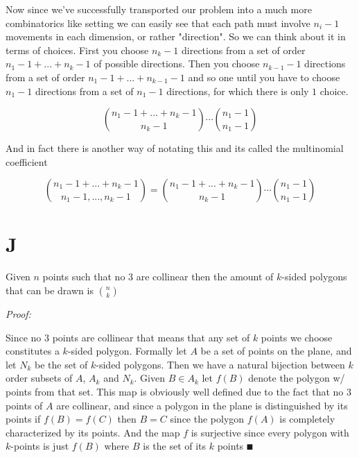 \documentclass[paper=a4,fontsize=paper,12.5pt]{book}
\newcommand{\3}{\vspace*{3mm}}
\newcommand{\Proof}{\textit{Proof:}}
\newcommand*{\comb}[2]{\binom{#1}{#2}}
\begin{document}
\3

Now since we've successfully transported our problem into a much more combinatorics like setting we can easily see that each path must involve ${n}_{i}-1$ movements in each dimension, or rather "direction". So we can think about it in terms of choices. First you choose ${n}_{k}-1$ directions from a set of order ${n}_{1} - 1 + ... + {n}_{k} - 1$ of possible directions. Then you choose ${n}_{k-1} - 1$ directions from a set of order ${n}_{1} - 1 + ... + {n}_{k-1} - 1$ and so one until you have to choose ${n}_{1} - 1$ directions from a set of ${n}_{1} - 1$ directions, for which there is only $1$ choice. 

\[\comb{{n}_{1} - 1 + ... + {n}_{k} - 1}{{n}_{k} - 1} \cdots \comb{{n}_{1} - 1}{{n}_{1} - 1} \]

\3

And in fact there is another way of notating this and its called the multinomial coefficient 


\[\comb{{n}_{1} - 1 + ... + {n}_{k} - 1}{{n}_{1} - 1, ... ,{n}_{k} - 1} = \comb{{n}_{1} - 1 + ... + {n}_{k} - 1}{{n}_{k} - 1} \cdots \comb{{n}_{1} - 1}{{n}_{1} - 1}\]

\3

\section*{J}

\3

\begin{theorem}

Given $n$ points such that no $3$ are collinear then the amount of $k$-sided polygons that can be drawn is $\comb{n}{k}$



\end{theorem}

\Proof

Since no $3$ points are collinear that means that any set of $k$ points we choose constitutes a $k$-sided polygon. Formally let $A$ be a set of points on the plane, and let ${N}_{k}$ be the set of $k$-sided polygons. Then we have a natural bijection between $k$ order subsets of $A$, ${A}_{k}$ and ${N}_{k}$. Given $B \in {A}_{k}$ let $f(B)$ denote the polygon w/ points from that set. This map is obviously well defined due to the fact that no $3$ points of $A$ are collinear, and since a polygon in the plane is distinguished by its points if $f(B) = f(C)$ then $B = C$ since the polygon $f(A)$ is completely characterized by its points. And the map $f$ is surjective since every polygon with $k$-points is just $f(B)$ where $B$ is the set of its $k$ points $\QED$
\end{document}

